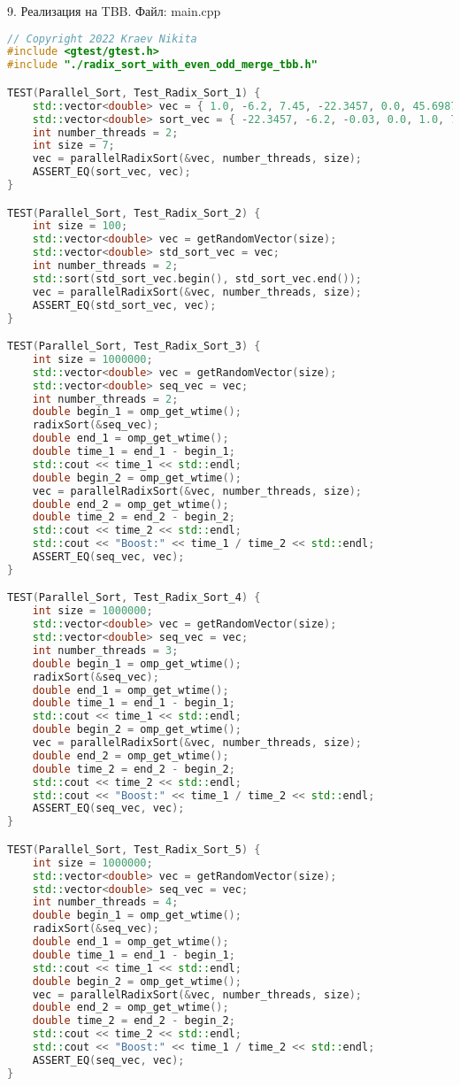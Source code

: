 \documentclass{report}
\begin{document}
\par 9. Реализация на TBB. Файл: main.cpp

\begin{lstlisting}[language=C++]
// Copyright 2022 Kraev Nikita
#include <gtest/gtest.h>
#include "./radix_sort_with_even_odd_merge_tbb.h"

TEST(Parallel_Sort, Test_Radix_Sort_1) {
    std::vector<double> vec = { 1.0, -6.2, 7.45, -22.3457, 0.0, 45.69876, -0.03 };
    std::vector<double> sort_vec = { -22.3457, -6.2, -0.03, 0.0, 1.0, 7.45, 45.69876 };
    int number_threads = 2;
    int size = 7;
    vec = parallelRadixSort(&vec, number_threads, size);
    ASSERT_EQ(sort_vec, vec);
}

TEST(Parallel_Sort, Test_Radix_Sort_2) {
    int size = 100;
    std::vector<double> vec = getRandomVector(size);
    std::vector<double> std_sort_vec = vec;
    int number_threads = 2;
    std::sort(std_sort_vec.begin(), std_sort_vec.end());
    vec = parallelRadixSort(&vec, number_threads, size);
    ASSERT_EQ(std_sort_vec, vec);
}

TEST(Parallel_Sort, Test_Radix_Sort_3) {
    int size = 1000000;
    std::vector<double> vec = getRandomVector(size);
    std::vector<double> seq_vec = vec;
    int number_threads = 2;
    double begin_1 = omp_get_wtime();
    radixSort(&seq_vec);
    double end_1 = omp_get_wtime();
    double time_1 = end_1 - begin_1;
    std::cout << time_1 << std::endl;
    double begin_2 = omp_get_wtime();
    vec = parallelRadixSort(&vec, number_threads, size);
    double end_2 = omp_get_wtime();
    double time_2 = end_2 - begin_2;
    std::cout << time_2 << std::endl;
    std::cout << "Boost:" << time_1 / time_2 << std::endl;
    ASSERT_EQ(seq_vec, vec);
}

TEST(Parallel_Sort, Test_Radix_Sort_4) {
    int size = 1000000;
    std::vector<double> vec = getRandomVector(size);
    std::vector<double> seq_vec = vec;
    int number_threads = 3;
    double begin_1 = omp_get_wtime();
    radixSort(&seq_vec);
    double end_1 = omp_get_wtime();
    double time_1 = end_1 - begin_1;
    std::cout << time_1 << std::endl;
    double begin_2 = omp_get_wtime();
    vec = parallelRadixSort(&vec, number_threads, size);
    double end_2 = omp_get_wtime();
    double time_2 = end_2 - begin_2;
    std::cout << time_2 << std::endl;
    std::cout << "Boost:" << time_1 / time_2 << std::endl;
    ASSERT_EQ(seq_vec, vec);
}

TEST(Parallel_Sort, Test_Radix_Sort_5) {
    int size = 1000000;
    std::vector<double> vec = getRandomVector(size);
    std::vector<double> seq_vec = vec;
    int number_threads = 4;
    double begin_1 = omp_get_wtime();
    radixSort(&seq_vec);
    double end_1 = omp_get_wtime();
    double time_1 = end_1 - begin_1;
    std::cout << time_1 << std::endl;
    double begin_2 = omp_get_wtime();
    vec = parallelRadixSort(&vec, number_threads, size);
    double end_2 = omp_get_wtime();
    double time_2 = end_2 - begin_2;
    std::cout << time_2 << std::endl;
    std::cout << "Boost:" << time_1 / time_2 << std::endl;
    ASSERT_EQ(seq_vec, vec);
}


\end{lstlisting}
\end{document}

